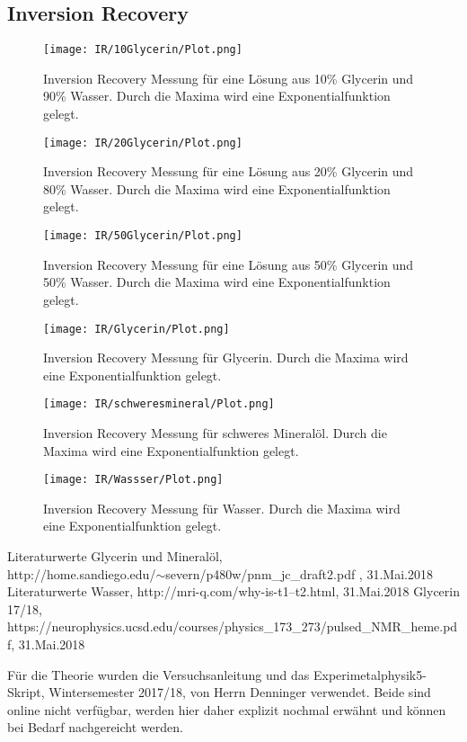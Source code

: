 \documentclass[10pt,twoside]{article}
\renewcommand{\1}{^{-1}}
\renewcommand{\2}{^{-2}}
\newcommand{\3}{^{-3}}
\newcommand{\4}{^{-4}}
\newcommand{\5}{^{-5}}
\newcommand{\6}{^{-6}}
\newcommand{\7}{^{-7}}
\newcommand{\8}{^{-8}}
\newcommand{\9}{^{-9}}
\begin{document}
\subsection{Inversion Recovery}
\begin{figure}[H]
\centering
\texttt{[image: IR/10Glycerin/Plot.png]} 
\caption{Inversion Recovery Messung für eine Lösung aus 10\% Glycerin und 90\% Wasser. Durch die Maxima wird eine Exponentialfunktion gelegt.}
\end{figure}
\begin{figure}[H]
\centering
\texttt{[image: IR/20Glycerin/Plot.png]} 
\caption{Inversion Recovery Messung für eine Lösung aus 20\% Glycerin und 80\% Wasser. Durch die Maxima wird eine Exponentialfunktion gelegt.}
\end{figure}
\begin{figure}[H]
\centering
\texttt{[image: IR/50Glycerin/Plot.png]} 
\caption{Inversion Recovery Messung für eine Lösung aus 50\% Glycerin und 50\% Wasser. Durch die Maxima wird eine Exponentialfunktion gelegt.}
\end{figure}
\begin{figure}[H]
\centering
\texttt{[image: IR/Glycerin/Plot.png]} 
\caption{Inversion Recovery Messung für Glycerin. Durch die Maxima wird eine Exponentialfunktion gelegt.}
\end{figure}
\begin{figure}[H]
\centering
\texttt{[image: IR/schweresmineral/Plot.png]} 
\caption{Inversion Recovery Messung für schweres Mineralöl. Durch die Maxima wird eine Exponentialfunktion gelegt.}
\end{figure}
\begin{figure}[H]
\centering
\texttt{[image: IR/Wassser/Plot.png]} 
\caption{Inversion Recovery Messung für Wasser. Durch die Maxima wird eine Exponentialfunktion gelegt.}
\end{figure}


\renewcommand{\refname}{\textbf{Literaturverzeichnis}}
\begin{thebibliography}{xx}

\glqq Literaturwerte Glycerin und Mineralöl\grqq ,\\
http://home.sandiego.edu/$\sim$severn/p480w/pnm\_jc\_draft2.pdf , 
 	31.Mai.2018
\glqq Literaturwerte Wasser\grqq ,
http://mri-q.com/why-is-t1--t2.html,
31.Mai.2018
\glqq Glycerin 17/18\grqq ,\\
https://neurophysics.ucsd.edu/courses/physics\_173\_273/pulsed\_NMR\_heme.pdf,
31.Mai.2018 
\end{thebibliography}

Für die Theorie wurden die Versuchsanleitung und das Experimetalphysik5-Skript, Wintersemester 2017/18, von Herrn Denninger verwendet.
Beide sind online nicht verfügbar, werden hier daher explizit nochmal erwähnt und können bei Bedarf nachgereicht werden.
\end{document}
